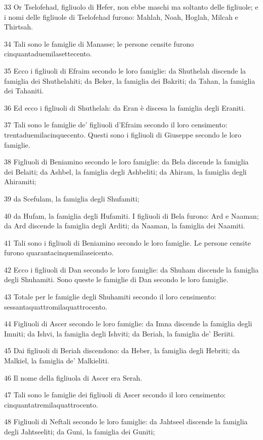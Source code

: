 \par 33 Or Tselofehad, figliuolo di Hefer, non ebbe maschi ma soltanto delle figliuole; e i nomi delle figliuole di Tselofehad furono: Mahlah, Noah, Hoglah, Milcah e Thirtsah.
\par 34 Tali sono le famiglie di Manasse; le persone censite furono cinquantaduemilasettecento.
\par 35 Ecco i figliuoli di Efraim secondo le loro famiglie: da Shuthelah discende la famiglia dei Shuthelahiti; da Beker, la famiglia dei Bakriti; da Tahan, la famiglia dei Tahaniti.
\par 36 Ed ecco i figliuoli di Shuthelah: da Eran è discesa la famiglia degli Eraniti.
\par 37 Tali sono le famiglie de' figliuoli d'Efraim secondo il loro censimento: trentaduemilacinquecento. Questi sono i figliuoli di Giuseppe secondo le loro famiglie.
\par 38 Figliuoli di Beniamino secondo le loro famiglie: da Bela discende la famiglia dei Belaiti; da Ashbel, la famiglia degli Ashbeliti; da Ahiram, la famiglia degli Ahiramiti;
\par 39 da Scefulam, la famiglia degli Shufamiti;
\par 40 da Hufam, la famiglia degli Hufamiti. I figliuoli di Bela furono: Ard e Naaman; da Ard discende la famiglia degli Arditi; da Naaman, la famiglia dei Naamiti.
\par 41 Tali sono i figliuoli di Beniamino secondo le loro famiglie. Le persone censite furono quarantacinquemilaseicento.
\par 42 Ecco i figliuoli di Dan secondo le loro famiglie: da Shuham discende la famiglia degli Shuhamiti. Sono queste le famiglie di Dan secondo le loro famiglie.
\par 43 Totale per le famiglie degli Shuhamiti secondo il loro censimento: sessantaquattromilaquattrocento.
\par 44 Figliuoli di Ascer secondo le loro famiglie: da Imna discende la famiglia degli Imniti; da Ishvi, la famiglia degli Ishviti; da Beriah, la famiglia de' Beriiti.
\par 45 Dai figliuoli di Beriah discendono: da Heber, la famiglia degli Hebriti; da Malkiel, la famiglia de' Malkieliti.
\par 46 Il nome della figliuola di Ascer era Serah.
\par 47 Tali sono le famiglie dei figliuoli di Ascer secondo il loro censimento: cinquantatremilaquattrocento.
\par 48 Figliuoli di Neftali secondo le loro famiglie: da Jahtseel discende la famiglia degli Jahtseeliti; da Guni, la famiglia dei Guniti;
